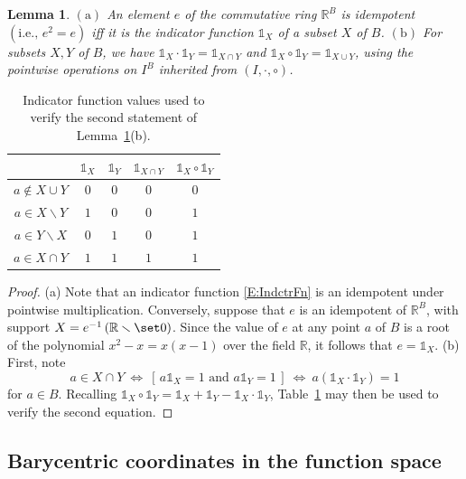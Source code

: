 \documentclass[12pt]{amsart}
\theoremstyle{plain}
\newtheorem{lemma}[theorem]{Lemma}
\theoremstyle{definition}
\numberwithin{equation}{section}
\begin{document}
\begin{lemma}\label{L:IdInRtoB}
$(\mathrm a)$
An element $e$ of the commutative ring $\mathbb R^B$ is \emph{idempotent} $(\mbox{i.e., }e^2=e)$ iff it is the indicator function $\mathds 1_X$ of a subset $X$ of $B$.
\vskip 2mm
\noindent
$(\mathrm b)$
For subsets $X,Y$ of $B$, we have
$
\mathds 1_X\cdot\mathds 1_Y=\mathds 1_{X\cap Y}
$
and
$
\mathds 1_X\circ\mathds 1_Y=\mathds 1_{X\cup Y}
$,
using the pointwise operations on $I^B$ inherited from $(I,\cdot,\circ)$.
\end{lemma}

\renewcommand{\arraystretch}{1.3}
\begin{table}[hbt]
\begin{tabular}{c||c|c|c|c}
&$\mathds 1_X$ &$\mathds 1_Y$ &$\mathds 1_{X\cap Y}$ &$\mathds 1_X\circ\mathds 1_Y$\\
\hline
\hline
$a\notin X\cup Y$ &$0$ &$0$ &$0$ &$0$\\
\hline
$a\in X\smallsetminus Y$ &$1$ &$0$ &$0$ &$1$\\
\hline
$a\in Y\smallsetminus X$ &$0$ &$1$ &$0$ &$1$\\
\hline
$a\in X\cap Y$ &$1$ &$1$ &$1$ &$1$\\
\hline
\hline
\end{tabular}
\vskip 2mm
\caption{Indicator function values used to verify the second statement of Lemma~\ref{L:IdInRtoB}(b).}
\label{T:aXYoneXY}
\end{table}


\begin{proof}
(a)
Note that an indicator function \eqref{E:IndctrFn} is an idempotent under pointwise multiplication. Conversely, suppose that $e$ is an idempotent of $\mathbb R^B$, with support $X=e^{-1}\left(\mathbb R\smallsetminus\set0\right)$. Since the value of $e$ at any point $a$ of $B$ is a root of the polynomial $x^2-x=x(x-1)$ over the field $\mathbb R$, it follows that $e=\mathds 1_X$.
\vskip 2mm
\noindent
(b)
First, note
$$
a\in X\cap Y
\
\Leftrightarrow
\
\left[\,a\mathds 1_X=1\mbox{ and }a\mathds 1_Y=1\,\right]
\
\Leftrightarrow
\
a(\mathds 1_X\cdot\mathds 1_Y)=1
$$
for $a\in B$. Recalling $\mathds 1_X\circ\mathds 1_Y=\mathds 1_X+\mathds 1_Y-\mathds 1_X\cdot\mathds 1_Y$, Table~\ref{T:aXYoneXY} may then be used to verify the second equation.
\end{proof}



\renewcommand{\arraystretch}{1}


\subsection{Barycentric coordinates in the function space}\label{SS:BaCoFuSp}
\end{document}
